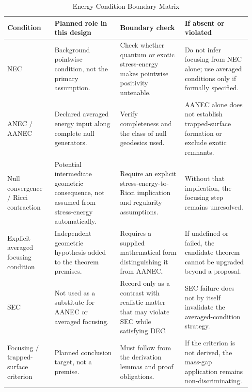 \documentclass[conference]{IEEEtran}
\begin{document}
\begin{table}[htbp]
\centering
\footnotesize
\setlength{\tabcolsep}{3pt}
\renewcommand{\arraystretch}{1.12}
\caption{Energy-Condition Boundary Matrix}
\label{tab:study-design-and-methods-sdm-boundary-matrix}
\begin{tabular}{|p{}|p{}|p{}|p{}|}
\hline
Condition & Planned role in this design & Boundary check & If absent or violated \\\hline
NEC & Background pointwise condition, not the primary assumption. & Check whether quantum or exotic stress-energy makes pointwise positivity untenable. & Do not infer focusing from NEC alone; use averaged conditions only if formally specified. \\\hline
ANEC / AANEC & Declared averaged energy input along complete null generators. & Verify completeness and the class of null geodesics used. & AANEC alone does not establish trapped-surface formation or exclude exotic remnants. \\\hline
Null convergence / Ricci contraction & Potential intermediate geometric consequence, not assumed from stress-energy automatically. & Require an explicit stress-energy-to-Ricci implication and regularity assumptions. & Without that implication, the focusing step remains unresolved. \\\hline
Explicit averaged focusing condition & Independent geometric hypothesis added to the theorem premises. & Requires a supplied mathematical form distinguishing it from AANEC. & If undefined or failed, the candidate theorem cannot be upgraded beyond a proposal. \\\hline
SEC & Not used as a substitute for AANEC or averaged focusing. & Record only as a contrast with realistic matter that may violate SEC while satisfying DEC. & SEC failure does not by itself invalidate the averaged-condition strategy. \\\hline
Focusing / trapped-surface criterion & Planned conclusion target, not a premise. & Must follow from the derivation lemmas and proof obligations. & If the criterion is not derived, the mass-gap application remains non-discriminating. \\\hline
\end{tabular}
\end{table}~\cite{cite_0ed84243cf171bc4}
\end{document}
